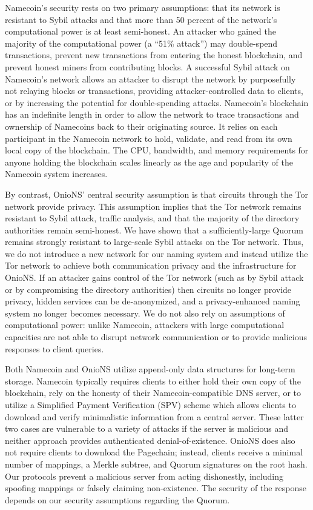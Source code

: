\documentclass[USenglish,oneside,twocolumn]{article}
\begin{document}
Namecoin's security rests on two primary assumptions: that its network is resistant to Sybil attacks and that more than 50 percent of the network's computational power is at least semi-honest. An attacker who gained the majority of the computational power (a ``51\% attack'') may double-spend transactions, prevent new transactions from entering the honest blockchain, and prevent honest miners from contributing blocks. A successful Sybil attack on Namecoin's network allows an attacker to disrupt the network by purposefully not relaying blocks or transactions, providing attacker-controlled data to clients, or by increasing the potential for double-spending attacks. Namecoin's blockchain has an indefinite length in order to allow the network to trace transactions and ownership of Namecoins back to their originating source. It relies on each participant in the Namecoin network to hold, validate, and read from its own local copy of the blockchain. The CPU, bandwidth, and memory requirements for anyone holding the blockchain scales linearly as the age and popularity of the Namecoin system increases.

By contrast, OnioNS' central security assumption is that circuits through the Tor network provide privacy. This assumption implies that the Tor network remains resistant to Sybil attack, traffic analysis, and that the majority of the directory authorities remain semi-honest. We have shown that a sufficiently-large Quorum remains strongly resistant to large-scale Sybil attacks on the Tor network. Thus, we do not introduce a new network for our naming system and instead utilize the Tor network to achieve both communication privacy and the infrastructure for OnioNS. If an attacker gains control of the Tor network (such as by Sybil attack or by compromising the directory authorities) then circuits no longer provide privacy, hidden services can be de-anonymized, and a privacy-enhanced naming system no longer becomes necessary. We do not also rely on assumptions of computational power: unlike Namecoin, attackers with large computational capacities are not able to disrupt network communication or to provide malicious responses to client queries.

Both Namecoin and OnioNS utilize append-only data structures for long-term storage. Namecoin typically requires clients to either hold their own copy of the blockchain, rely on the honesty of their Namecoin-compatible DNS server, or to utilize a Simplified Payment Verification \cite{nakamoto2008bitcoin} (SPV) scheme which allows clients to download and verify minimalistic information from a central server. These latter two cases are vulnerable to a variety of attacks if the server is malicious and neither approach provides authenticated denial-of-existence. OnioNS does also not require clients to download the Pagechain; instead, clients receive a minimal number of mappings, a Merkle subtree, and Quorum signatures on the root hash. Our protocols prevent a malicious server from acting dishonestly, including spoofing mappings or falsely claiming non-existence. The security of the response depends on our security assumptions regarding the Quorum.
\end{document}
